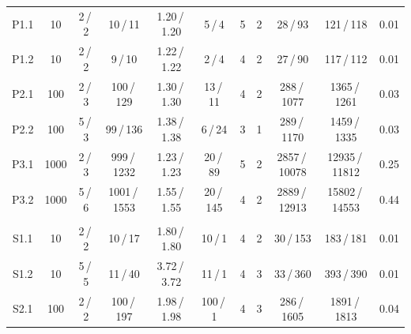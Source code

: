 \begin{table}
{\begin{tabular}{@{\extracolsep{4pt}}ccccccccccc@{}}

P1.1 & 10 		& 2\,/\,2 		& 10\,/\,11 			& 1.20\,/\,1.20 	& 5\,/\,4 		& 5 & 2 	& 28\,/\,93 			& 121\,/\,118           & 0.01      \\	%
P1.2 & 10 		& 2\,/\,2 		& 9\,/\,10 				& 1.22\,/\,1.22 	& 2\,/\,4 		& 4 & 2 	& 27\,/\,90 			& 117\,/\,112           & 0.01      \\  %
P2.1 & 100 		& 2\,/\,3 		& 100\,/\,129 			& 1.30\,/\,1.30 	& 13\,/\,11 	& 4 & 2 	& 288\,/\,1077 			& 1365\,/\,1261         & 0.03      \\  %
P2.2 & 100 		& 5\,/\,3 		& 99\,/\,136 			& 1.38\,/\,1.38 	& 6\,/\,24 		& 3 & 1 	& 289\,/\,1170 			& 1459\,/\,1335         & 0.03      \\	%
P3.1 & 1000 	& 2\,/\,3 		& 999\,/\,1232 			& 1.23\,/\,1.23 	& 20\,/\,89 	& 5 & 2 	& 2857\,/\,10078 		& 12935\,/\,11812       & 0.25      \\	%
P3.2 & 1000 	& 5\,/\,6 		& 1001\,/\,1553 		& 1.55\,/\,1.55 	& 20\,/\,145 	& 4 & 2 	& 2889\,/\,12913 		& 15802\,/\,14553       & 0.44      \\  %
	 &  		&  		&  						&  				&  			&   &   &  		&	          \\                    
S1.1 & 10 		& 2\,/\,2 		& 10\,/\,17 			& 1.80\,/\,1.80 	& 10\,/\,1 		& 4 & 2 	& 30\,/\,153 			& 183\,/\,181           & 0.01      \\	%
S1.2 & 10 		& 5\,/\,5 		& 11\,/\,40 			& 3.72\,/\,3.72 	& 11\,/\,1 		& 4 & 3 	& 33\,/\,360 			& 393\,/\,390           & 0.01      \\	%
S2.1 & 100 		& 2\,/\,2 		& 100\,/\,197 			& 1.98\,/\,1.98 	& 100\,/\,1 	& 4 & 3 	& 286\,/\,1605 			& 1891\,/\,1813         & 0.04      \\	%

\end{tabular}}
\end{table}
